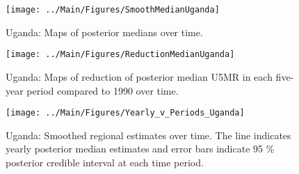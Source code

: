 \documentclass[12pt]{article}\usepackage[]{graphicx}\usepackage[]{color}
\newenvironment{knitrout}{}{} %
\begin{document}
\begin{knitrout}
\color{fgcolor}\begin{figure}[bht]

{\centering \texttt{[image: ../Main/Figures/SmoothMedianUganda]} 

}

\caption[Uganda]{Uganda: Maps of posterior medians over time.}\label{fig:unnamed-chunk-324}
\end{figure}


\end{knitrout}
\begin{knitrout}
\color{fgcolor}\begin{figure}[bht]

{\centering \texttt{[image: ../Main/Figures/ReductionMedianUganda]} 

}

\caption[Uganda]{Uganda: Maps of reduction of posterior median U5MR in each five-year period compared to 1990 over time.}\label{fig:unnamed-chunk-325}
\end{figure}


\end{knitrout}
\begin{knitrout}
\color{fgcolor}\begin{figure}[bht]

{\centering \texttt{[image: ../Main/Figures/Yearly\_v\_Periods\_Uganda]} 

}

\caption[Uganda]{Uganda: Smoothed regional estimates over time. The line indicates yearly posterior median estimates and error bars indicate 95 \% posterior credible interval at each time period.}\label{fig:unnamed-chunk-326}
\end{figure}


\end{knitrout}
\end{document}
